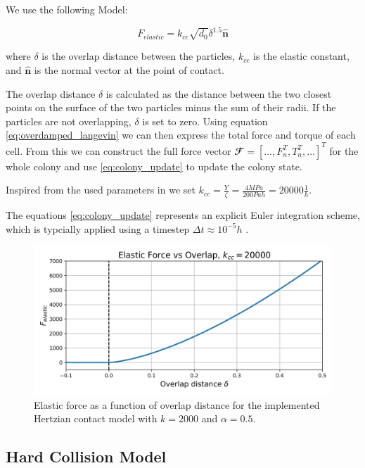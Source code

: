 \documentclass[conference]{IEEEtran}
\begin{document}
We use the following Model:

$$
    F_{elastic} =k_{cc} \sqrt{d_0} \delta^{1.5} \hat{\mathbf{n}}
$$

where $\delta$ is the overlap distance between the particles, $k_{cc}$ is the elastic constant, and $\hat{\mathbf{n}}$ is the normal vector at the point of contact.

The overlap distance $\delta$ is calculated as the distance between the two closest points on the surface of the two particles minus the sum of their radii. If the particles are not overlapping, $\delta$ is set to zero. Using equation \autoref{eq:overdamped_langevin} we can then express the total force and torque of each cell. From this we can construct the full force vector $\mathbfcal{F} = [ \dots, F_n^T, T_n^T, \dots]^T$ for the whole colony and use \autoref{eq:colony_update} to update the colony state.

Inspired from the used parameters in \cite{You2018} we set $k_{cc} = \frac{Y}{\zeta} = \frac{4 MPa}{200 Pa h} = 20000 \frac{1}{h}$.


The equations \autoref{eq:colony_update} represents an explicit Euler integration scheme, which is typcially applied using  a timestep $\Delta t \approx 10^{-5} h$ \cite{Khan_2024}\cite{You2018}\cite{Blanchard2015}.


\begin{figure}[H]
    \centering
    \includegraphics[width=\linewidth]{figures/hertzian_contact_model.png}
    \caption{Elastic force as a function of overlap distance for the implemented Hertzian contact model with $k=2000$ and $\alpha=0.5$.}
    \label{fig:hertzian_contact_model}
\end{figure}

\newpage
\subsection{Hard Collision Model}
\end{document}
